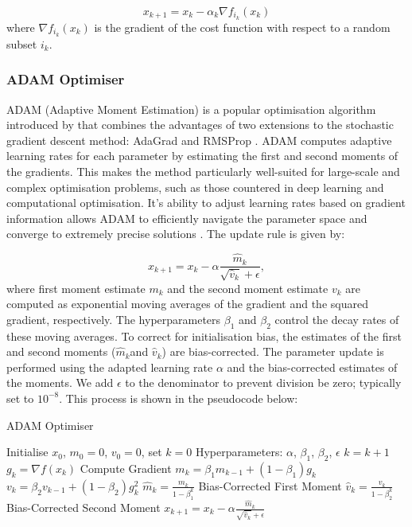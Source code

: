 \documentclass[a4paper]{report}
\begin{document}
\begin{equation}\label{SGD}
x_{k+1} = x_k - \alpha_k \nabla f_{i_k}(x_k)	
\end{equation}
where $\nabla f_{i_k}(x_k)$ is the gradient of the cost function with respect to a random subset $i_k$.

\subsubsection{ADAM Optimiser}\label{section:ADAM}
ADAM (Adaptive Moment Estimation) is a popular optimisation algorithm introduced by \citet{kingma2014adam} that combines the advantages of two extensions to the stochastic gradient descent method: AdaGrad \citep{duchi2011adaptive} and RMSProp \citep{tieleman2012rmsprop}. ADAM computes adaptive learning rates for each parameter by estimating the first and second moments of the gradients. This makes the method particularly well-suited for large-scale and complex optimisation problems, such as those countered in deep learning and computational optimisation. It's ability to adjust learning rates based on gradient information allows ADAM to efficiently navigate the parameter space and converge to extremely precise solutions \citep{reddi2019convergence}. The update rule is given by:

\begin{equation}
x_{k+1} = x_{k} - \alpha \frac{\hat{m}_{k}}{\sqrt{\hat{v}_{k}} + \epsilon},
\end{equation}
where first moment estimate $m_k$ and the second moment estimate $v_k$ are computed as exponential moving averages of the gradient and the squared gradient, respectively. The hyperparameters $\beta_1$ and $\beta_2$ control the decay rates of these moving averages. To correct for initialisation bias, the estimates of the first and second moments ($\hat{m}_k$and $\hat{v}_k$) are bias-corrected. The parameter update is performed using the adapted learning rate $\alpha$ and the bias-corrected estimates of the moments. We add $\epsilon$ to the denominator to prevent division be zero; typically set to $10^{-8}$. This process is shown in the pseudocode below:

\begin{algorithm}[H]
\caption{ADAM Optimiser}
\label{algo:ADAM}
\begin{algorithmic}[1]
\State Initialise \( x_0 \), \( m_0 = 0 \), \( v_0 = 0 \), set \( k = 0 \)
\State Hyperparameters: \( \alpha \), \( \beta_1 \), \( \beta_2 \), \( \epsilon \)
    \State \( k = k + 1 \)
    \State \( g_k = \nabla f(x_k) \) \Comment Compute Gradient
    \State \( m_k = \beta_1 m_{k-1} + (1 - \beta_1) g_k \)
    \State \( v_k = \beta_2 v_{k-1} + (1 - \beta_2) g_k^2 \)
    \State \( \hat{m}_k = \frac{m_k}{1 - \beta_1^k} \) \Comment Bias-Corrected First Moment
    \State  \( \hat{v}_k = \frac{v_k}{1 - \beta_2^k} \) \Comment Bias-Corrected Second Moment
    \State \( x_{k+1} = x_k - \alpha \frac{\hat{m}_k}{\sqrt{\hat{v}_k} + \epsilon} \)
\EndWhile
\end{algorithmic}
\end{algorithm}
\end{document}
